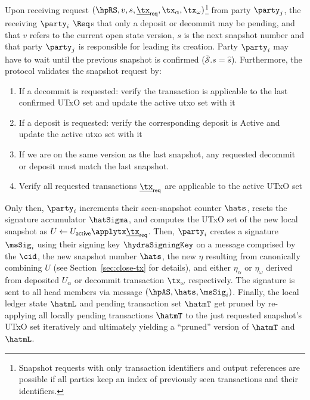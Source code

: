 \quad Upon receiving request
$(\hpRS,v,s,\underline{\tx}_{\mathsf{req}}, \tx_\alpha, \tx_\omega)$\footnote{Snapshot
	requests with only transaction identifiers and output references are possible
	if all parties keep an index of previously seen transactions and their
	identifiers.} from party $\party_j$, the receiving $\party_i$ $\Req$s that
only a deposit or decommit may be pending, and that $v$ refers to the current
open state version, $s$ is the next snapshot number and that party $\party_j$ is
responsible for leading its creation. Party $\party_i$ may have to wait until
the previous snapshot is confirmed ($\bar{\mathcal{S}}.s = \hat{s}$).
Furthermore, the protocol validates the snapshot request by:
\begin{enumerate}
	\item If a decommit is requested: verify the transaction is applicable to the
	      last confirmed UTxO set and update the active utxo set with it
	\item If a deposit is requested: verify the corresponding deposit is
	      $\text{Active}$ and update the active utxo set with it
	\item If we are on the same version as the last snapshot, any requested
	      decommit or deposit must match the last snapshot.
	\item Verify all requested transactions $\underline{\tx}_{\mathsf{req}}$ are
	      applicable to the active UTxO set
\end{enumerate}
Only then, $\party_i$ increments their seen-snapshot counter $\hats$, resets the
signature accumulator $\hatSigma$, and computes the UTxO set of the new local
snapshot as
$U \gets U_{\mathsf{active}} \applytx \underline{\tx}_{\mathsf{req}}$. Then,
$\party_i$ creates a signature $\msSig_i$ using their signing key
$\hydraSigningKey$ on a message comprised by the $\cid$, the new snapshot number
$\hats$, the new $\eta$ resulting from canonically combining $U$ (see
Section~\ref{sec:close-tx} for details), and either $\eta_{\alpha}$ or
$\eta_{\omega}$ derived from deposited $U_{\alpha}$ or decommit transaction
$\tx_{\omega}$ respectively. The signature is sent to all head members via
message $(\hpAS,\hats,\msSig_i)$. Finally, the local ledger state $\hatmL$ and
pending transaction set $\hatmT$ get pruned by re-applying all locally pending
transactions $\hatmT$ to the just requested snapshot's UTxO set iteratively and
ultimately yielding a ``pruned'' version of $\hatmT$ and $\hatmL$. \\


